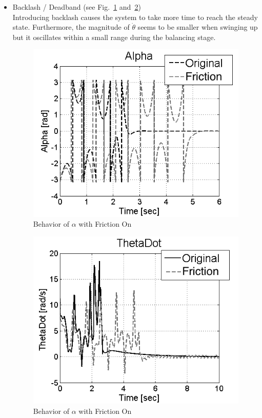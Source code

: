 \documentclass{article}
\theoremstyle{plain}
\theoremstyle{definition}
\theoremstyle{remark}
\begin{document}
\begin{itemize}
\item Backlash / Deadband (see Fig.~\ref{fig:q10_b1} and~\ref{fig:q10_b2})\\
Introducing backlash causes the system to take more time to reach the steady state. Furthermore, the magnitude of $\dot{\theta}$ seems to be smaller when swinging up but it oscillates within a small range during the balancing stage.
\begin{figure}[h]
\includegraphics[width=1\textwidth]{q10_b1.png}
\caption{Behavior of $\alpha$ with Friction On} \label{tex}
\label{fig:q10_b1}
\end{figure}
\begin{figure}[h]
\includegraphics[width=1\textwidth]{q10_b2.png}
\caption{Behavior of $\alpha$ with Friction On} \label{tex}
\label{fig:q10_b2}
\end{figure}


\end{itemize}
\end{document}
